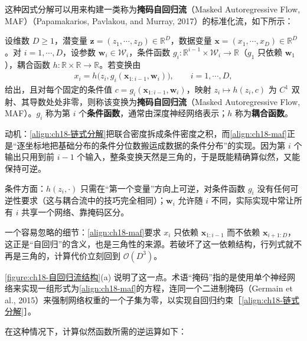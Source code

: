 \documentclass[../../main.tex]{subfiles}
\begin{document}
这种因式分解可以用来构建一类称为\textbf{掩码自回归流}（Masked Autoregressive Flow, MAF）（Papamakarios, Pavlakou, and Murray, 2017）的标准化流，如下所示：

\begin{definition}[掩码自回归流]\label{definition:ch18-掩码自回归流}
设维数 $D\geqslant1$，潜变量 $\bm{z}=(z_1,\cdots,z_D)\in\mathbb{R}^{D}$，数据变量 $\bm{x}=(x_1,\cdots,x_D)\in\mathbb{R}^{D}$。对 $i=1,\cdots,D$，设参数 $\bm{w}_i\in\mathcal{W}_i$，条件函数 $g_i:\mathbb{R}^{i-1}\times\mathcal{W}_i\to\mathbb{R}$（$g_1$ 只依赖 $\bm{w}_1$），耦合函数 $h:\mathbb{R}\times\mathbb{R}\to\mathbb{R}$。若变换由
\begin{align}
  x_i=h\big(z_i,g_i(\bm{x}_{1:i-1},\bm{w}_i)\big),\qquad i=1,\cdots,D,
  \label{align:ch18-maf}
\end{align}
给出，且对每个固定的条件值 $c=g_i(\bm{x}_{1:i-1},\bm{w}_i)$，映射 $z_i\mapsto h(z_i,c)$ 为 $C^{1}$ 双射、其导数处处非零，则称该变换为\textbf{掩码自回归流}（Masked Autoregressive Flow, MAF）。$g_i$ 称为第 $i$ 个\textbf{条件函数}，通常由深度神经网络表示；$h$ 称为\textbf{耦合函数}。
\end{definition}

\begin{remark}
动机：\eqref{align:ch18-链式分解}把联合密度拆成条件密度之积，而\eqref{align:ch18-maf}正是“逐坐标地把基础分布的条件分位数搬运成数据的条件分布”的实现。因为第 $i$ 个输出只用到前 $i-1$ 个输入，整条变换天然是三角的，于是既能精确算似然，又能保持可逆。

条件方面：$h(z_i,\cdot)$ 只需在“第一个变量”方向上可逆，对条件函数 $g_i$ 没有任何可逆性要求（这与耦合流中的技巧完全相同）；$\bm{w}_i$ 允许随 $i$ 不同，实际实现中常让所有 $i$ 共享一个网络、靠掩码区分。

一个容易忽略的细节：\eqref{align:ch18-maf}要求 $x_i$ 只依赖 $\bm{x}_{1:i-1}$ 而不依赖 $\bm{x}_{i+1:D}$，这正是“自回归”的含义，也是三角性的来源。若破坏了这一依赖结构，行列式就不再是三角的，计算代价立刻回到 $\mathcal{O}(D^{3})$。
\end{remark}

\cref{figure:ch18-自回归流结构}(a) 说明了这一点。术语“掩码”指的是使用单个神经网络来实现一组形式为\eqref{align:ch18-maf}的方程，连同一个二进制掩码（Germain et al., 2015）来强制网络权重的一个子集为零，以实现自回归约束［\eqref{align:ch18-链式分解}］。

在这种情况下，计算似然函数所需的逆运算如下：
\end{document}
